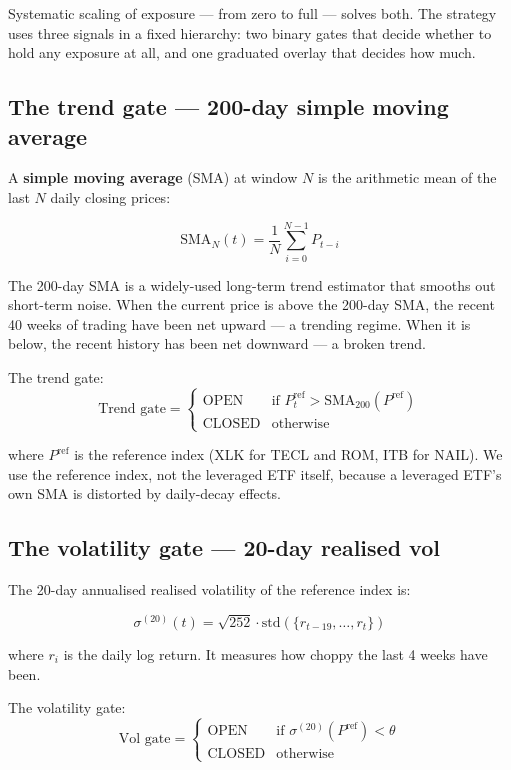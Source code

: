 \documentclass[11pt,a4paper]{article}
\begin{document}
Systematic scaling of exposure --- from zero to full --- solves both. The strategy uses three signals in a fixed hierarchy: two binary gates that decide whether to hold any exposure at all, and one graduated overlay that decides how much.

\subsection{The trend gate --- 200-day simple moving average}

A \textbf{simple moving average} (SMA) at window $N$ is the arithmetic mean of the last $N$ daily closing prices:

\[
\text{SMA}_{N}(t) = \frac{1}{N} \sum_{i=0}^{N-1} P_{t-i}
\]

The 200-day SMA is a widely-used long-term trend estimator that smooths out short-term noise. When the current price is above the 200-day SMA, the recent 40 weeks of trading have been net upward --- a trending regime. When it is below, the recent history has been net downward --- a broken trend.

The trend gate:
\[
\text{Trend gate} = \begin{cases} \text{OPEN}  & \text{if } P_t^{\text{ref}} > \text{SMA}_{200}(P^{\text{ref}}) \\ \text{CLOSED} & \text{otherwise} \end{cases}
\]

where $P^{\text{ref}}$ is the reference index (XLK for TECL and ROM, ITB for NAIL). We use the reference index, not the leveraged ETF itself, because a leveraged ETF's own SMA is distorted by daily-decay effects.

\subsection{The volatility gate --- 20-day realised vol}

The 20-day annualised realised volatility of the reference index is:

\[
\sigma^{(20)}(t) = \sqrt{252} \cdot \text{std}\left(\{r_{t-19}, \ldots, r_t\}\right)
\]

where $r_i$ is the daily log return. It measures how choppy the last 4 weeks have been.

The volatility gate:
\[
\text{Vol gate} = \begin{cases} \text{OPEN}  & \text{if } \sigma^{(20)}(P^{\text{ref}}) < \theta \\ \text{CLOSED} & \text{otherwise} \end{cases}
\]
\end{document}
